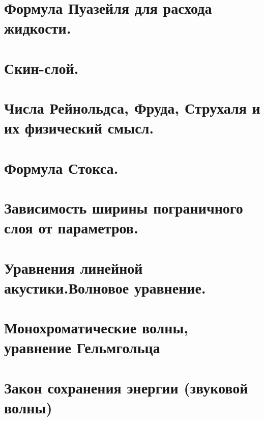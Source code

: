 \begin{multicols*}{4}
		\section{Формула Пуазейля для расхода жидкости.}
		\section{Скин-слой.}
		\section{Числа Рейнольдса, Фруда, Струхаля и их физический смысл.}
		\section{Формула Стокса.}
		\section{Зависимость ширины пограничного слоя от параметров.}
		\section{Уравнения линейной акустики.Волновое уравнение.}
		\section{Монохроматические волны, уравнение Гельмгольца}
		\section{Закон сохранения энергии (звуковой волны)}
	\end{multicols*}
